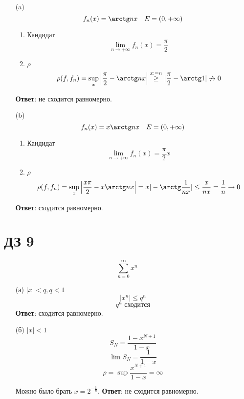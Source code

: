 \begin{exercise}[2756]
    \begin{itemize}
        \item [(a)] \[f_n(x) = \arctg nx \quad E = (0, +\infty)\]

              \begin{enumerate}
                  \item Кандидат
                        \[\lim_{n\to +\infty} f_n(x) = \frac{\pi}{2}\]
                  \item \(\rho\)
                        \[\rho(f, f_n) = \sup_{x} \left|\frac{\pi}{2} - \arctg nx\right| \stackrel{x: = n}{\ge } |\frac{\pi}{2} - \arctg 1| \not\to 0\]
              \end{enumerate}

              \textbf{Ответ}: не сходится равномерно.

        \item [(b)] \[f_n(x) = x\arctg nx \quad E = (0, +\infty)\]

              \begin{enumerate}
                  \item Кандидат
                        \[\lim_{n\to +\infty} f_n(x) = \frac{\pi}{2}x\]
                  \item \(\rho\)
                        \[\rho(f, f_n) = \sup_{x} \left|\frac{x\pi}{2} - x\arctg nx\right| = x|-\arctg \frac{1}{nx}| \leq \frac{x}{nx} = \frac{1}{n} \to 0\]
              \end{enumerate}

              \textbf{Ответ}: сходится равномерно.
    \end{itemize}
\end{exercise}

\section*{ДЗ 9}


\begin{exercise}[2767]
    \[\sum_{n = 0}^{\infty} x^n\]
    \begin{itemize}
        \item [(а)] \(|x|< q, q < 1\)
              \[|x^n| \leq q^n\]
              \[q^n \text{ сходится}\]
              \textbf{Ответ}: сходится равномерно.
        \item [(б)] \(|x|< 1\)
              \[S_N = \frac{1 - x^{N + 1}}{1 - x}\]
              \[\lim S_N = \frac{1}{1 - x}\]
              \[\rho = \sup \frac{x^{N + 1}}{1 - x} = \infty\]

              Можно было брать \(x = 2^{ - \frac{1}{n}}\).
              \textbf{Ответ}: не сходится равномерно.
    \end{itemize}
\end{exercise}

